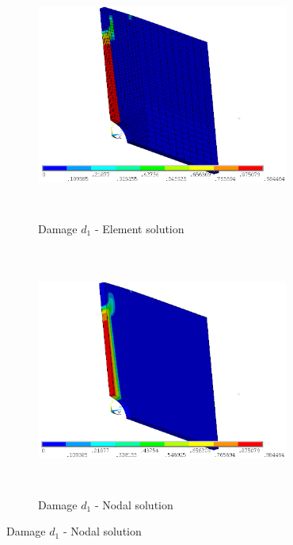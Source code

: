 \documentclass[a4paper,12pt,twoside]{report}
\begin{document}
\begin{figure}[htbp!]
     \captionsetup[subfigure]{justification=centering}
     \begin{subfigure}[b]{0.4\textwidth}
         \includegraphics[width=8.3cm,height=8.2cm,keepaspectratio]{27.d1-lt-e.png}
         \caption{Damage $d_{1}$ - Element solution}
         \label{fig:d1-lt-e}
     \end{subfigure}
     \hspace{1.8cm}
     \begin{subfigure}[b]{0.4\textwidth}
         \includegraphics[width=8.3cm,height=8.2cm,keepaspectratio]{27.d1-lt-n.png}
         \caption{Damage $d_{1}$ - Nodal solution}
         \label{fig:d1-lt-n}
     \end{subfigure}
\end{figure}
\FloatBarrier
\end{document}
